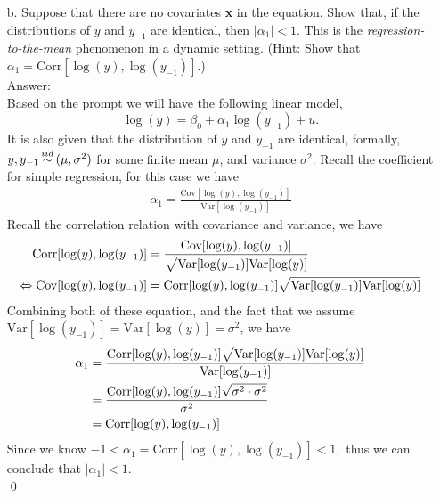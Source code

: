 \documentclass[10pt]{article}
\newcommand\iid{\stackrel{\mathclap{iid}}{\sim}}
\newcommand{\V}{\text{Var}}
\newcommand{\corr}{\text{Corr}}
\newcommand{\cov}{\text{Cov}}
\begin{document}
\begin{enumerate}
\item[b.] Suppose that there are no covariates \textbf{x} in the equation. Show that, if the distributions of $y$ and $y_{-1}$ are identical, then $|\alpha_1|<1$. This is the \textit{regression-to-the-mean}
phenomenon in a dynamic setting. (Hint: Show that $\alpha_1=\corr[\log(y),\log(y_{-1})].$)
\\ Answer: \\
Based on the prompt we will have the following linear model,
\[\log(y)=\beta_0+\alpha_1\log(y_{-1})+u.\]
It is also given that the distribution of $y$ and $y_{-1}$ are identical, formally, $y,y_{-1}\iid(\mu,\sigma^2)$ for some finite mean $\mu$, and variance $\sigma^2$. Recall the coefficient for simple regression, for this case we have
\begin{align}
    \alpha_1=\frac{\cov[\log(y),\log(y_{-1})]}{\V[\log(y_{-1})]}
\end{align}
Recall the correlation relation with covariance and variance, we have
\begin{align}
    \corr[\log(y),\log(y_{-1})]&=\frac{\cov[\log(y),\log(y_{-1})]}{\sqrt{\V[\log(y_{-1})]\V[\log(y)]}} \notag \\
    \Leftrightarrow \cov[\log(y),\log(y_{-1})]&= \corr[\log(y),\log(y_{-1})] \sqrt{\V[\log(y_{-1})]\V[\log(y)]}
\end{align}
Combining both of these equation, and the fact that we assume $\V[\log(y_{-1})]=\V[\log(y)]=\sigma^2$, we have
\begin{align}
    \alpha_1&=\frac{\corr[\log(y),\log(y_{-1})] \sqrt{\V[\log(y_{-1})]\V[\log(y)]}}{\V[\log(y_{-1})]} \notag \\
    &=\frac{\corr[\log(y),\log(y_{-1})] \sqrt{\sigma^2\cdot \sigma^2}}{\sigma^2} \notag \\
    &=\corr[\log(y),\log(y_{-1})]
\end{align}
Since we know $-1< \alpha_1=\corr[\log(y),\log(y_{-1})]<1,$ thus we can conclude that $|\alpha_1|<1.$ \\ \qed
\end{enumerate}
\end{document}

